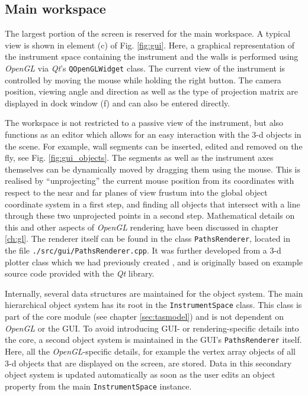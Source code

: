 \subsection{Main workspace}
\label{sec:gui_gl}
The largest portion of the screen is reserved for the main workspace.
A typical view is shown in element (c) of Fig. \ref{fig:gui}.
Here, a graphical representation of the instrument space containing the instrument and the walls 
is performed using \textit{OpenGL} \cite{web_OpenGL} via \textit{Qt}'s
\lstinline[language=C++]|QOpenGLWidget| \cite{web_QOpenGLWidget} class.
The current view of the instrument is controlled by moving the mouse while holding the right button.
The camera position, viewing angle and direction as well as the type of projection matrix are 
displayed in dock window (f) and can also be entered directly.

The workspace is not restricted to a passive view of the instrument, but also functions as an editor
which allows for an easy interaction with the 3-d objects in the scene. For example, wall segments can
be inserted, edited and removed on the fly, see Fig. \ref{fig:gui_objects}.
The segments as well as the instrument axes themselves can be dynamically moved by dragging them using the 
mouse. This is realised by ``unprojecting'' the current mouse position from its coordinates with respect 
to the near and far planes of view frustum into the global object coordinate system in a first step, 
and finding all objects that intersect with a line through these two unprojected points in a second step. 
Mathematical details on this and other aspects of \textit{OpenGL} rendering have been discussed 
in chapter \ref{ch:gl}.
The renderer itself can be found in the class \lstinline[language=C++]|PathsRenderer|, located in
the file \lstinline|./src/gui/PathsRenderer.cpp|.
It was further developed from a 3-d plotter class which we had previously created
\cite{Takin2021, PhDWeber, Takin2017, Takin2016}, and is originally based on example source code
\cite{web_QOpenGLWidgetExampleThreaded} provided with the \textit{Qt} \cite{web_Qt} library.

Internally, several data structures are maintained for the object system. 
The main hierarchical object system has its root in the \lstinline[language=C++]|InstrumentSpace|
class. This class is part of the core module (see chapter \ref{sec:tasmodel}) and is not dependent
on \textit{OpenGL} or the GUI.
To avoid introducing GUI- or rendering-specific details into the core, a second object
system is maintained in the GUI's \lstinline[language=C++]|PathsRenderer| itself. 
Here, all the \textit{OpenGL}-specific details, for example the vertex array objects \cite{wiki_vao} 
of all 3-d objects that are displayed on the screen, are stored.
Data in this secondary object system is updated automatically as soon as the user edits an object 
property from the main \lstinline[language=C++]|InstrumentSpace| instance.

